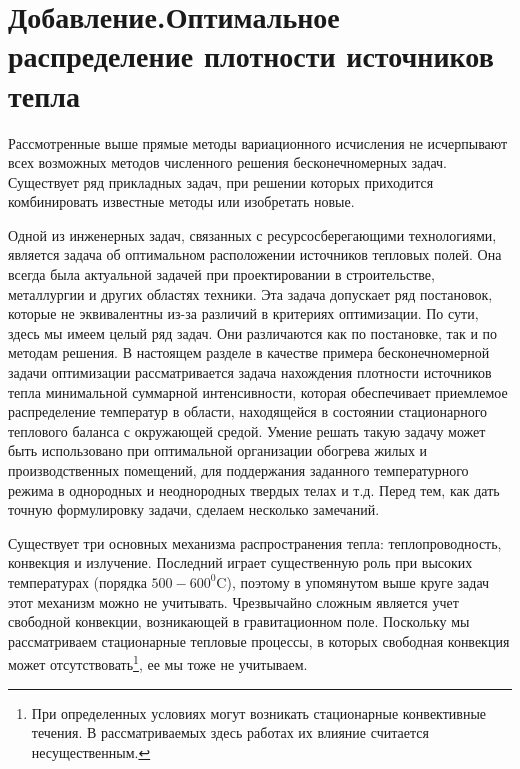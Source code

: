 \section*{ \sloppy \center Добавление.Оптимальное распределение плотности источников тепла }
\sloppy
\emergencystretch=20pt
\setcounter{section}{5} %
\setcounter{subsection}{0}
\setcounter{equation}{0}
\renewcommand{\thesubsection}{\Asbuk{section}.\arabic{subsection}}
\renewcommand{\theequation}{\Asbuk{section}.\arabic{equation}}

 Рассмотренные выше прямые методы вариационного исчисления не исчерпывают всех возможных методов численного решения бесконечномерных задач.
Существует ряд прикладных задач, при решении которых приходится комбинировать известные методы или изобретать новые.

Одной из инженерных задач, связанных с ресурсосберегающими технологиями, является задача об оптимальном расположении источников тепловых полей. Она всегда была актуальной задачей при проектировании в строительстве, металлургии и других областях техники. Эта задача допускает ряд постановок, которые не эквивалентны из-за различий в критериях оптимизации. По сути, здесь мы имеем целый ряд задач. Они различаются как по постановке, так и по методам решения. В настоящем разделе в качестве примера бесконечномерной задачи оптимизации рассматривается задача нахождения плотности источников тепла минимальной суммарной интенсивности, которая обеспечивает приемлемое распределение температур в области, находящейся в состоянии стационарного теплового баланса с окружающей средой. Умение решать такую задачу может быть использовано при оптимальной организации обогрева жилых и производственных помещений, для поддержания заданного температурного режима в однородных и неоднородных твердых телах и т.д. Перед тем, как дать точную формулировку задачи, сделаем несколько замечаний.

Существует три основных механизма распространения тепла: теплопроводность, конвекция и излучение. Последний играет существенную роль при высоких температурах (порядка $500-600^0 \text{C}$), поэтому в упомянутом выше круге задач этот механизм можно не учитывать. Чрезвычайно сложным является учет свободной конвекции, возникающей в гравитационном поле. Поскольку мы рассматриваем стационарные тепловые процессы, в которых свободная конвекция может
 отсутствовать\footnote{  При определенных условиях могут возникать стационарные конвективные течения. В рассматриваемых здесь работах их влияние считается несущественным.}, ее мы тоже не учитываем.

